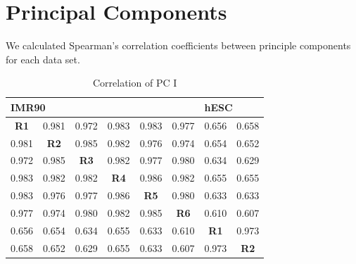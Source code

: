 \newpage
\section*{Principal Components}

We calculated Spearman's correlation coefficients between principle components for each data set.

\begin{table}[H]
  \centering
  \caption{Correlation of \gls{PC} I}\label{table:PC1Correlations}
  \begin{tabularx}{\textwidth}{@{}cccccccc@{}}
    \toprule
    \multicolumn{6}{l}{IMR90} & \multicolumn{2}{l}{hESC} \\
    \midrule
    \textbf{R1} & 0.981       & 0.972       & 0.983       & 0.983       & 0.977       & 0.656       & 0.658 \\
    0.981       & \textbf{R2} & 0.985       & 0.982       & 0.976       & 0.974       & 0.654       & 0.652 \\
    0.972       & 0.985       & \textbf{R3} & 0.982       & 0.977       & 0.980       & 0.634       & 0.629 \\
    0.983       & 0.982       & 0.982       & \textbf{R4} & 0.986       & 0.982       & 0.655       & 0.655 \\
    0.983       & 0.976       & 0.977       & 0.986       & \textbf{R5} & 0.980       & 0.633       & 0.633 \\
    0.977       & 0.974       & 0.980       & 0.982       & 0.985       & \textbf{R6} & 0.610       & 0.607 \\
    0.656       & 0.654       & 0.634       & 0.655       & 0.633       & 0.610       & \textbf{R1} & 0.973  \\
    0.658       & 0.652       & 0.629       & 0.655       & 0.633       & 0.607       & 0.973       & \textbf{R2}    \\
    \bottomrule
  \end{tabularx}
\end{table}

